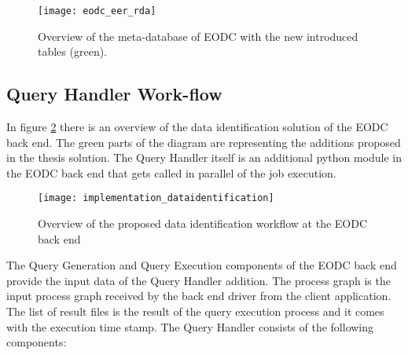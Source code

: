 \documentclass[draft,final]{vutinfth} %
\begin{document}
\begin{figure}[h]
	\centering
	\texttt{[image: eodc\_eer\_rda]}
	\caption{Overview of the meta-database of EODC with the new introduced tables (green).}
	\label{fig:eer_rda} %
\end{figure}

\subsection{Query Handler Work-flow}
In figure \ref{fig:impldataid} there is an overview of the data identification solution of the EODC back end. The green parts of the diagram are representing the additions proposed in the thesis solution. The Query Handler itself is an additional python module in the EODC back end that gets called in parallel of the job execution. 

\begin{figure}[h]
	\centering
	\texttt{[image: implementation\_dataidentification]}
	\caption{Overview of the proposed data identification workflow at the EODC back end}
	\label{fig:impldataid} %
\end{figure}

The Query Generation and Query Execution components of the EODC back end provide the input data of the Query Handler addition. The process graph is the input process graph received by the back end driver from the client application. The list of result files is the result of the query execution process and it comes with the execution time stamp. The Query Handler consists of the following components:
\end{document}
